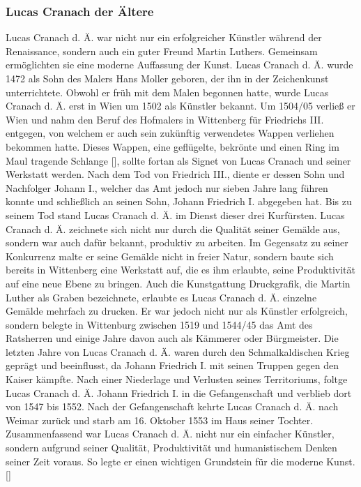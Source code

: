 \documentclass[a4paper,12pt,oneside]{article}
\begin{document}
    \subsubsection{Lucas Cranach der Ältere}
      Lucas Cranach d. Ä. war nicht nur ein erfolgreicher Künstler während der Renaissance,
      sondern auch ein guter Freund Martin Luthers. Gemeinsam ermöglichten sie eine moderne 
      Auffassung der Kunst.
      Lucas Cranach d. Ä. wurde 1472 als Sohn des Malers Hans Moller geboren,
      der ihn in der Zeichenkunst unterrichtete.
      Obwohl er früh mit dem Malen begonnen hatte, wurde Lucas Cranach d. Ä. erst in Wien
      um 1502 als Künstler bekannt. Um 1504/05
      verließ er Wien und nahm den Beruf des Hofmalers in Wittenberg für Friedrichs III. 
      entgegen, von welchem er auch sein zukünftig verwendetes Wappen verliehen bekommen 
      hatte.
      Dieses Wappen, eine \glqq geflügelte, bekrönte und einen Ring im Maul tragende
      Schlange\grqq{} [\cite[15]{heydenreich2017lucas}], sollte fortan als Signet von
      Lucas Cranach und seiner Werkstatt werden.
      Nach dem Tod von Friedrich III., diente er dessen Sohn und Nachfolger
      Johann I., welcher das Amt jedoch nur sieben Jahre lang führen konnte und
      schließlich an seinen Sohn, Johann Friedrich I. abgegeben hat.
      Bis zu seinem Tod stand Lucas Cranach d. Ä. im Dienst dieser drei Kurfürsten.
      Lucas Cranach d. Ä. zeichnete sich nicht nur durch die Qualität seiner Gemälde aus,
      sondern war auch dafür bekannt, produktiv zu arbeiten.
      Im Gegensatz zu seiner Konkurrenz malte er seine Gemälde nicht in freier
      Natur, sondern baute sich bereits in Wittenberg eine Werkstatt auf, die es
      ihm erlaubte, seine Produktivität auf eine neue Ebene zu bringen.
      Auch die Kunstgattung \glqq Druckgrafik\grqq{}, die Martin Luther 
      als Graben bezeichnete, erlaubte es
      Lucas Cranach d. Ä. einzelne Gemälde mehrfach zu drucken.
      Er war jedoch nicht nur als Künstler erfolgreich, sondern belegte in Wittenburg
      zwischen 1519 und 1544/45 das Amt des Ratsherren und einige Jahre davon auch als
      Kämmerer oder Bürgmeister.
      Die letzten Jahre von Lucas Cranach d. Ä. waren durch den Schmalkaldischen Krieg
      geprägt und beeinflusst, da Johann Friedrich I. mit seinen Truppen gegen den
      Kaiser kämpfte. Nach einer Niederlage und
      Verlusten seines Territoriums, foltge Lucas Cranach d. Ä. Johann Friedrich I.
      in die Gefangenschaft und verblieb dort von 1547 bis 1552.
      Nach der Gefangenschaft kehrte Lucas Cranach d. Ä. nach Weimar zurück und starb
      am 16. Oktober 1553 im Haus seiner Tochter.
      Zusammenfassend war Lucas Cranach d. Ä. nicht nur ein einfacher Künstler, sondern
      aufgrund seiner Qualität, Produktivität und humanistischem Denken
      seiner Zeit voraus. So legte er einen wichtigen Grundstein für die moderne
      Kunst. [\cite{heydenreich2017lucas}]
\end{document}
